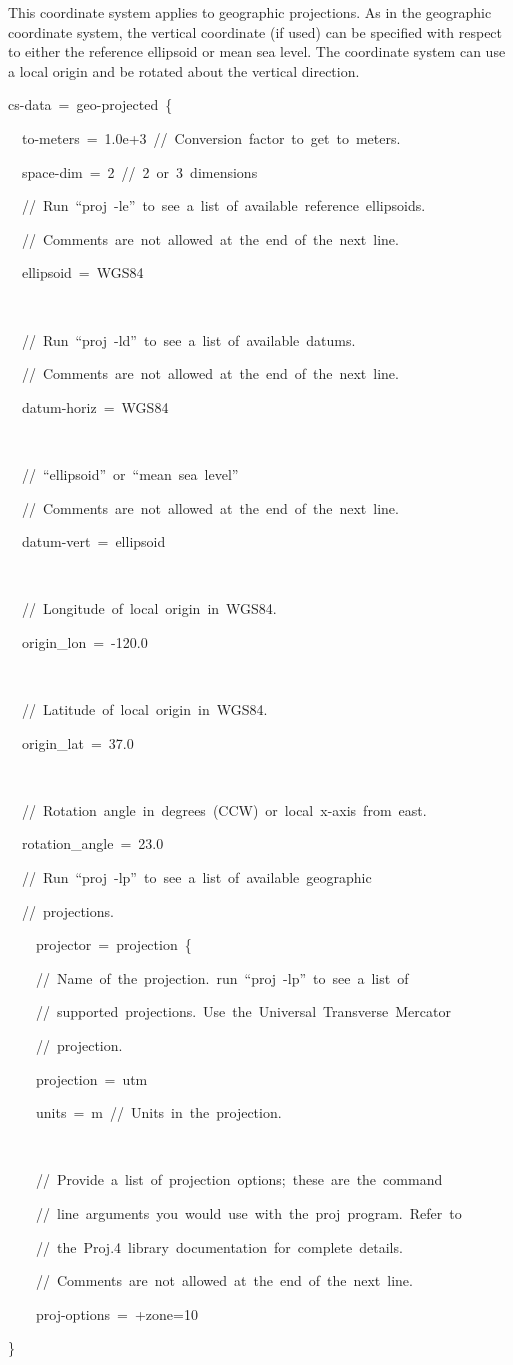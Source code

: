 This coordinate system applies to geographic projections. As in the
geographic coordinate system, the vertical coordinate (if used) can
be specified with respect to either the reference ellipsoid or mean
sea level. The coordinate system can use a local origin and be rotated
about the vertical direction.
\begin{lyxcode}
cs-data~=~geo-projected~\{

~~to-meters~=~1.0e+3~//~Conversion~factor~to~get~to~meters.

~~space-dim~=~2~//~2~or~3~dimensions



~~//~Run~``proj~-le''~to~see~a~list~of~available~reference~ellipsoids.

~~//~Comments~are~not~allowed~at~the~end~of~the~next~line.

~~ellipsoid~=~WGS84

~

~~//~Run~``proj~-ld''~to~see~a~list~of~available~datums.

~~//~Comments~are~not~allowed~at~the~end~of~the~next~line.

~~datum-horiz~=~WGS84

~

~~//~``ellipsoid''~or~``mean~sea~level''

~~//~Comments~are~not~allowed~at~the~end~of~the~next~line.

~~datum-vert~=~ellipsoid

~

~~//~Longitude~of~local~origin~in~WGS84.

~~origin\_lon~=~-120.0

~~

~~//~Latitude~of~local~origin~in~WGS84.

~~origin\_lat~=~37.0

~

~~//~Rotation~angle~in~degrees~(CCW)~or~local~x-axis~from~east.

~~rotation\_angle~=~23.0



~~//~Run~``proj~-lp''~to~see~a~list~of~available~geographic~

~~//~projections.

~~~~projector~=~projection~\{

~~~~//~Name~of~the~projection.~run~``proj~-lp''~to~see~a~list~of~

~~~~//~supported~projections.~Use~the~Universal~Transverse~Mercator

~~~~//~projection.

~~~~projection~=~utm

~~~~units~=~m~//~Units~in~the~projection.

~

~~~~//~Provide~a~list~of~projection~options;~these~are~the~command~

~~~~//~line~arguments~you~would~use~with~the~proj~program.~Refer~to

~~~~//~the~Proj.4~library~documentation~for~complete~details.

~~~~//~Comments~are~not~allowed~at~the~end~of~the~next~line.

~~~~proj-options~=~+zone=10

\}
\end{lyxcode}
